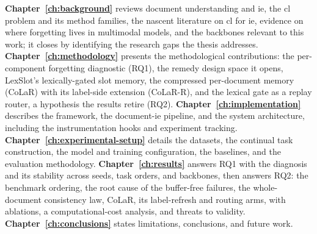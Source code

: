 \textbf{Chapter~\ref{ch:background}} reviews document understanding and \gls{ie},
the \gls{cl} problem and its method families, the nascent literature on \gls{cl}
for \gls{ie}, evidence on where forgetting lives in multimodal models, and the
backbones relevant to this work; it closes by identifying the research gaps the
thesis addresses.
\textbf{Chapter~\ref{ch:methodology}} presents the methodological
contributions: the per-component forgetting diagnostic (RQ1), the remedy design space it
opens, LexSlot's lexically-gated slot memory, the compressed per-document memory (CoLaR) with
its label-side extension (CoLaR-R), and the lexical gate as a replay router, a hypothesis the
results retire (RQ2).
\textbf{Chapter~\ref{ch:implementation}} describes the framework, the
document-\gls{ie} pipeline, and the system architecture, including the
instrumentation hooks and experiment tracking.
\textbf{Chapter~\ref{ch:experimental-setup}} details the datasets, the continual
task construction, the model and training configuration, the baselines, and the
evaluation methodology.
\textbf{Chapter~\ref{ch:results}} answers RQ1 with the diagnosis and its stability across
seeds, task orders, and backbones, then answers RQ2: the benchmark ordering, the root cause of
the buffer-free failures, the whole-document consistency law, CoLaR, its label-refresh and
routing arms, with ablations, a computational-cost analysis, and threats to validity.
\textbf{Chapter~\ref{ch:conclusions}} states limitations, conclusions, and future
work.
